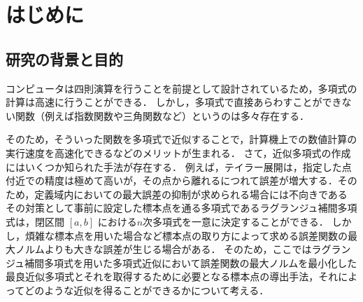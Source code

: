 \section*{はじめに}
\label{sec:introduction}
  \subsection*{研究の背景と目的}
    コンピュータは四則演算を行うことを前提として設計されているため，多項式の計算は高速に行うことができる．
    しかし，多項式で直接あらわすことができない関数（例えば指数関数や三角関数など）というのは多々存在する．

    そのため，そういった関数を多項式で近似することで，計算機上での数値計算の実行速度を高速化できるなどのメリットが生まれる．
    さて，近似多項式の作成にはいくつか知られた手法が存在する．
    例えば，テイラー展開は，指定した点付近での精度は極めて高いが，その点から離れるにつれて誤差が増大する．そのため，定義域内においての最大誤差の抑制が求められる場合には不向きである
    その対策として事前に設定した標本点を通る多項式であるラグランジュ補間多項式は，閉区間 $\left[a,b\right]$ における$n$次多項式を一意に決定することができる．
    しかし，煩雑な標本点を用いた場合など標本点の取り方によって求める誤差関数の最大ノルムよりも大きな誤差が生じる場合がある．
    そのため，ここではラグランジュ補間多項式を用いた多項式近似において誤差関数の最大ノルムを最小化した最良近似多項式とそれを取得するために必要となる標本点の導出手法，それによってどのような近似を得ることができるかについて考える．

